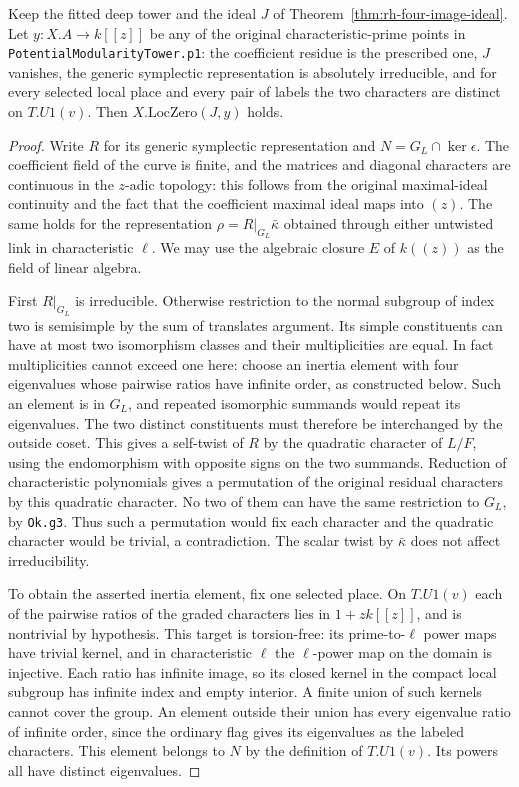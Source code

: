 \begin{theorem}
\label{thm:rh-four-p1}
Keep the fitted deep tower and the ideal $J$ of
Theorem~\ref{thm:rh-four-image-ideal}. Let
$y:X.A\to k[[z]]$ be any of the original characteristic-prime
points in \texttt{PotentialModularityTower.p1}: the coefficient
residue is the prescribed one, $J$ vanishes, the generic
symplectic representation is absolutely irreducible, and for
every selected local place and every pair of labels the two
characters are distinct on $T.U1(v)$. Then
$X.\mathrm{LocZero}(J,y)$ holds.
\end{theorem}
\begin{proof}
Write $R$ for its generic symplectic representation and
$N=G_L\cap\ker\epsilon$. The coefficient field of the
curve is finite, and the matrices and diagonal characters
are continuous in the $z$-adic topology: this follows from
the original maximal-ideal continuity and the fact that
the coefficient maximal ideal maps into $(z)$.
The same holds for the representation
$\rho=R|_{G_L}\bar\kappa$ obtained through either untwisted
link in characteristic $\ell$. We may use the algebraic
closure $E$ of $k((z))$ as the field of linear algebra.

First $R|_{G_L}$ is irreducible. Otherwise restriction to
the normal subgroup of index two is semisimple by the sum
of translates argument. Its simple constituents can have
at most two isomorphism classes and their multiplicities
are equal. In fact multiplicities cannot exceed one here:
choose an inertia element with four eigenvalues whose
pairwise ratios have infinite order, as constructed below.
Such an element is in $G_L$, and repeated isomorphic
summands would repeat its eigenvalues. The two distinct
constituents must therefore be interchanged by the outside
coset. This gives a self-twist of $R$ by the quadratic
character of $L/F$, using the endomorphism with opposite
signs on the two summands. Reduction of characteristic
polynomials gives a permutation of the original residual
characters by this quadratic character. No two of them
can have the same restriction to $G_L$, by \texttt{Ok.g3}.
Thus such a permutation would fix each character and the
quadratic character would be trivial, a contradiction.
The scalar twist by $\bar\kappa$ does not affect
irreducibility.

To obtain the asserted inertia element, fix one selected
place. On $T.U1(v)$ each of the pairwise ratios of the
graded characters lies in $1+zk[[z]]$, and is nontrivial
by hypothesis. This target is torsion-free: its prime-to-$\ell$
power maps have trivial kernel, and in characteristic
$\ell$ the $\ell$-power map on the domain is injective.
Each ratio has infinite image, so its closed kernel in the
compact local subgroup has infinite index and empty
interior. A finite union of such kernels cannot cover the
group. An element outside their union has every
eigenvalue ratio of infinite order, since the ordinary
flag gives its eigenvalues as the labeled characters.
This element belongs to $N$ by the definition of
$T.U1(v)$. Its powers all have distinct eigenvalues.


\end{proof}
